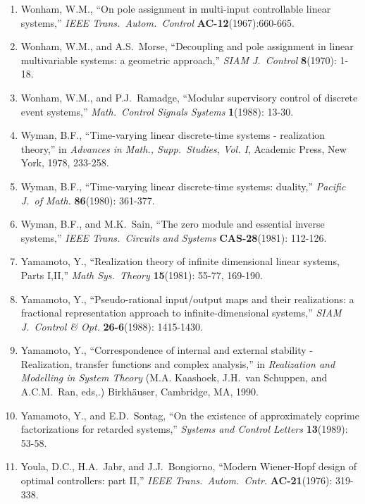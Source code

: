 \begin{enumerate}
\item
Wonham, W.M., ``On pole assignment in multi-input controllable linear
systems,'' {\it IEEE Trans.\ Autom.\ Control} {\bf AC-12}(1967):660-665.

\item
Wonham, W.M., and A.S.\ Morse, ``Decoupling and pole assignment in linear
multivariable systems: a geometric approach,'' {\it SIAM J.\ Control} {\bf
8}(1970): 1-18.

\item
Wonham, W.M., and P.J.\ Ramadge, ``Modular supervisory control of discrete
event systems,'' {\it Math.\ Control Signals Systems} {\bf 1}(1988): 13-30.

\item
Wyman, B.F., ``Time-varying linear discrete-time systems - realization
theory,'' in {\it Advances in Math., Supp.\ Studies, Vol. I}, Academic Press,
New York, 1978, 233-258.

\item
Wyman, B.F., ``Time-varying linear discrete-time systems: duality,'' {\it
Pacific J.\ of Math.} {\bf 86}(1980): 361-377.

\item
Wyman, B.F., and M.K.\ Sain, ``The zero module and essential inverse
systems,'' {\it IEEE Trans.\ Circuits and Systems} {\bf CAS-28}(1981):
112-126.

\item
Yamamoto, Y., ``Realization theory of infinite dimensional linear systems,
Parts I,II,'' {\it Math Sys.\ Theory} {\bf 15}(1981): 55-77, 169-190.

\item
Yamamoto, Y., ``Pseudo-rational input/output maps and their realizations: a
fractional representation approach to infinite-dimensional systems,'' {\it
SIAM J.\ Control \& Opt.} {\bf 26-6}(1988): 1415-1430.

\item
Yamamoto, Y., ``Correspondence of internal and external stability -
Realization, transfer functions and complex analysis,'' in {\it Realization
and Modelling in System Theory} (M.A. Kaashoek, J.H.\ van Schuppen, and
A.C.M.\ Ran, eds,.)  Birkh\"auser, Cambridge, MA, 1990.

\item
Yamamoto, Y., and E.D.\ Sontag, ``On the existence of approximately coprime
factorizations for retarded systems,'' {\it Systems and Control Letters} {\bf
13}(1989): 53-58.

\item
Youla, D.C., H.A.\ Jabr, and J.J.\ Bongiorno, ``Modern Wiener-Hopf design of
optimal controllers: part II,'' {\it IEEE Trans.\ Autom.\ Cntr.} {\bf
AC-21}(1976): 319-338.


\end{enumerate}
